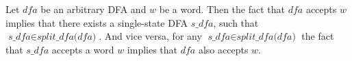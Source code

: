 \begin{theorem}
  Let $\textit{dfa}$ be an arbitrary DFA and $w$ be a word. Then the fact that $\textit{dfa}$ accepts $w$ implies that there exists a single-state DFA $\textit{s\_dfa}$, such that $\textit{s\_dfa} \in \textit{split\_dfa(dfa)}$. And vice versa, for any $\textit{s\_dfa} \in \textit{split\_dfa(dfa)}$ the fact that $\textit{s\_dfa}$ accepts a word $w$ implies that $\textit{dfa}$ also accepts $w$.
\end{theorem}

%


